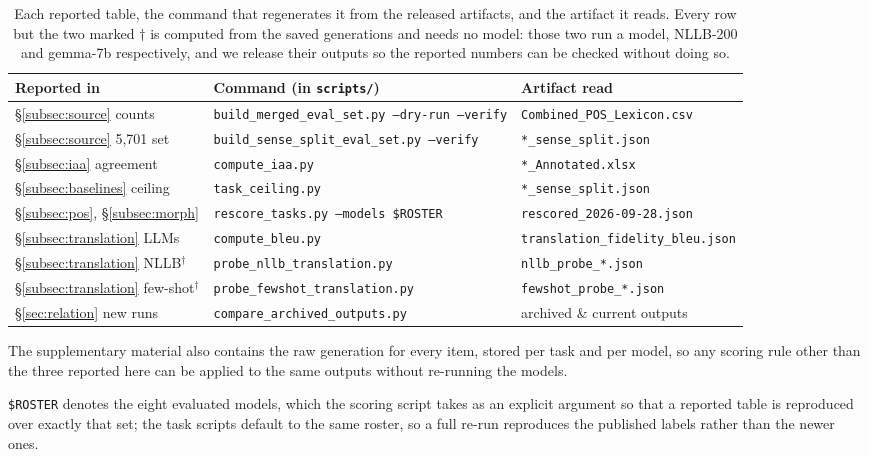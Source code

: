 \documentclass[11pt]{article}
\begin{document}
\begin{table}[t]
\centering
\small
\begin{tabular}{@{}lll@{}}
\toprule
Reported in & Command (in \texttt{scripts/}) & Artifact read \\
\midrule
\S\ref{subsec:source} counts    & \texttt{build\_merged\_eval\_set.py --dry-run --verify} & \texttt{Combined\_POS\_Lexicon.csv} \\
\S\ref{subsec:source} 5,701 set & \texttt{build\_sense\_split\_eval\_set.py --verify}     & \texttt{*\_sense\_split.json} \\
\S\ref{subsec:iaa} agreement    & \texttt{compute\_iaa.py}                                & \texttt{*\_Annotated.xlsx} \\
\S\ref{subsec:baselines} ceiling & \texttt{task\_ceiling.py}                              & \texttt{*\_sense\_split.json} \\
\S\ref{subsec:pos}, \S\ref{subsec:morph} & \texttt{rescore\_tasks.py --models \$ROSTER}   & \texttt{rescored\_2026-09-28.json} \\
\S\ref{subsec:translation} LLMs & \texttt{compute\_bleu.py}                               & \texttt{translation\_fidelity\_bleu.json} \\
\S\ref{subsec:translation} NLLB$^\dagger$ & \texttt{probe\_nllb\_translation.py}          & \texttt{nllb\_probe\_*.json} \\
\S\ref{subsec:translation} few-shot$^\dagger$ & \texttt{probe\_fewshot\_translation.py}   & \texttt{fewshot\_probe\_*.json} \\
\S\ref{sec:relation} new runs   & \texttt{compare\_archived\_outputs.py}                  & archived \& current outputs \\
\bottomrule
\end{tabular}
\caption{Each reported table, the command that regenerates it from the
released artifacts, and the artifact it reads. Every row but the two marked
$\dagger$ is computed from the saved generations and needs no model: those
two run a model, NLLB-200 and gemma-7b respectively, and we release their
outputs so the reported numbers can be checked without doing so.}
\label{tab:repro}
\end{table}

The supplementary material also contains the raw generation for every item,
stored per task and per model, so any scoring rule other than the three
reported here can be applied to the same outputs without re-running the
models.

\texttt{\$ROSTER} denotes the eight evaluated models, which the scoring
script takes as an explicit argument so that a reported table is reproduced
over exactly that set; the task scripts default to the same roster, so a
full re-run reproduces the published labels rather than the newer ones.
\end{document}

